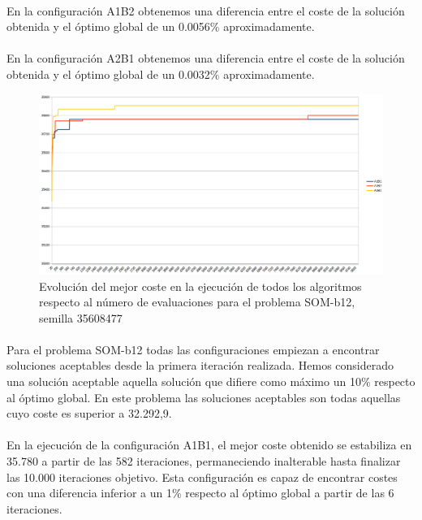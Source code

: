 	\paragraph{}En la configuración A1B2 obtenemos una diferencia entre el coste de la solución obtenida y el óptimo global de un 0.0056\% aproximadamente.
	
	\paragraph{}En la configuración A2B1 obtenemos una diferencia entre el coste de la solución obtenida y el óptimo global de un 0.0032\% aproximadamente.

	\begin{figure}[H]
		\centering
		\includegraphics[scale=0.3]{img/SOM2conver.png}
		\caption{Evolución del mejor coste en la ejecución de todos los algoritmos respecto al número de evaluaciones para el problema SOM-b12, semilla 35608477}
		\label{SOM-b_12_historico}
	\end{figure}

	\paragraph{}Para el problema SOM-b12 todas las configuraciones empiezan a encontrar soluciones aceptables desde la primera iteración realizada. Hemos considerado una solución aceptable aquella solución que difiere como máximo un 10\% respecto al óptimo global. En este problema las soluciones aceptables son todas aquellas cuyo coste es superior a 32.292,9.
	
	\paragraph{}En la ejecución de la configuración A1B1, el mejor coste obtenido se estabiliza en 35.780 a partir de las 582 iteraciones, permaneciendo inalterable hasta finalizar las 10.000 iteraciones objetivo. Esta configuración es capaz de encontrar costes con una diferencia inferior a un 1\% respecto al óptimo global a partir de las 6 iteraciones.
	
